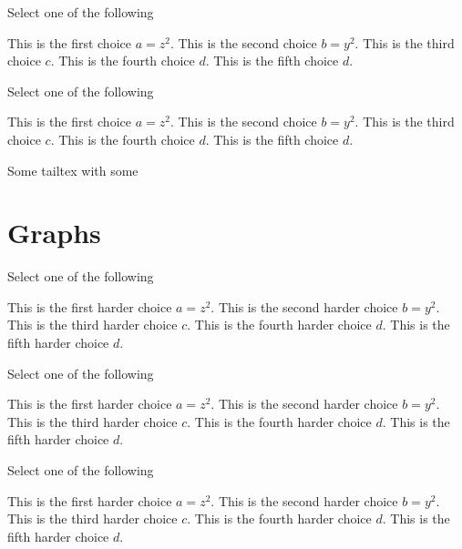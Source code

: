 \begin{problem}[90][Xchoice II]
Select one of the following
\begin{xchoice}
\choice This is the first choice $a = z^2$.
\choice This is the second choice $b = y^2$.
\choice* This is the third choice $c$.
\choice* This is the fourth choice $d$.
\choice This is the fifth choice $d$.
\end{xchoice}
\end{problem}

\begin{problem}
Select one of the following
\begin{xchoice}
\choice This is the first choice $a = z^2$.
\choice This is the second choice $b = y^2$.
\choice* This is the third choice $c$.
\choice* This is the fourth choice $d$.
\choice This is the fifth choice $d$.
\end{xchoice}
\end{problem}
Some tailtex with some \command


\section[100]{Graphs}

\begin{problem}
Select one of the following
\begin{xchoice}
\choice This is the first harder choice $a = z^2$.
\choice This is the second harder choice $b = y^2$.
\choice* This is the third harder choice $c$.
\choice* This is the fourth harder choice $d$.
\choice This is the fifth harder choice $d$.
\end{xchoice}
\end{problem}


\begin{problem}
Select one of the following
\begin{xchoice}
\choice This is the first harder choice $a = z^2$.
\choice This is the second harder choice $b = y^2$.
\choice* This is the third harder choice $c$.
\choice* This is the fourth harder choice $d$.
\choice This is the fifth harder choice $d$.
\end{xchoice}
\end{problem}

\begin{problem}
Select one of the following
\begin{xchoice}
\choice This is the first harder choice $a = z^2$.
\choice This is the second harder choice $b = y^2$.
\choice* This is the third harder choice $c$.
\choice* This is the fourth harder choice $d$.
\choice This is the fifth harder choice $d$.
\end{xchoice}
\end{problem}



